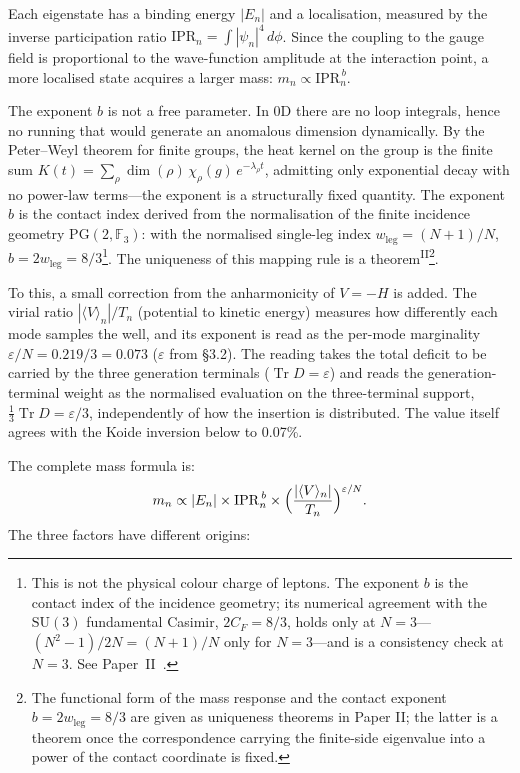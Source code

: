 \documentclass[12pt,a4paper]{article}
\newcommand{\PII}{\textsuperscript{\textup{II}}}
\begin{document}
Each eigenstate has a binding energy $|E_n|$ and a localisation, measured by the inverse participation ratio $\mathrm{IPR}_n = \int|\psi_n|^4\,d\phi$. Since the coupling to the gauge field is proportional to the wave-function amplitude at the interaction point, a more localised state acquires a larger mass: $m_n \propto \mathrm{IPR}_n^{\,b}$.

The exponent $b$ is not a free parameter. In 0D there are no loop integrals, hence no running that would generate an anomalous dimension dynamically. By the Peter--Weyl theorem for finite groups, the heat kernel on the group is the finite sum $K(t) = \sum_\rho \dim(\rho)\,\chi_\rho(g)\,e^{-\lambda_\rho t}$, admitting only exponential decay with no power-law terms---the exponent is a structurally fixed quantity. The exponent $b$ is the contact index derived from the normalisation of the finite incidence geometry $\mathrm{PG}(2,\mathbb{F}_3)$: with the normalised single-leg index $w_\mathrm{leg} = (N{+}1)/N$, $b = 2w_\mathrm{leg} = 8/3$\footnote{This is not the physical colour charge of leptons. The exponent $b$ is the contact index of the incidence geometry; its numerical agreement with the $\mathrm{SU}(3)$ fundamental Casimir, $2C_F = 8/3$, holds only at $N = 3$---$(N^2{-}1)/2N = (N{+}1)/N$ only for $N = 3$---and is a consistency check at $N = 3$. See Paper~II~\cite{paper2}.}. The uniqueness of this mapping rule is a theorem\PII{}\footnote{The functional form of the mass response and the contact exponent $b = 2w_\mathrm{leg} = 8/3$ are given as uniqueness theorems in Paper II; the latter is a theorem once the correspondence carrying the finite-side eigenvalue into a power of the contact coordinate is fixed.}.

To this, a small correction from the anharmonicity of $V = -H$ is added. The virial ratio $|\langle V\rangle_n|/T_n$ (potential to kinetic energy) measures how differently each mode samples the well, and its exponent is read as the per-mode marginality $\varepsilon/N = 0.219/3 = 0.073$ ($\varepsilon$ from \S3.2). The reading takes the total deficit to be carried by the three generation terminals ($\operatorname{Tr} D = \varepsilon$) and reads the generation-terminal weight as the normalised evaluation on the three-terminal support, $\tfrac13\operatorname{Tr} D = \varepsilon/3$, independently of how the insertion is distributed. The value itself agrees with the Koide inversion below to 0.07\%.

The complete mass formula is:
\begin{equation}\label{eq:mass}
  m_n \propto |E_n| \times \mathrm{IPR}_n^{\,b}
  \times \Bigl(\frac{|\langle V \rangle_n|}{T_n}\Bigr)^{\varepsilon/N}.
\end{equation}
The three factors have different origins:
\end{document}

